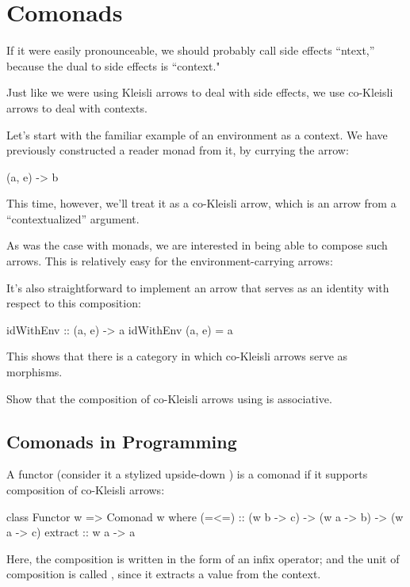 \documentclass[DaoFP]{subfiles}
\begin{document}
\setcounter{chapter}{15}

\chapter{Comonads}

If it were easily pronounceable, we should probably call side effects ``ntext,'' because the dual to side effects is ``context."

Just like we were using Kleisli arrows to deal with side effects, we use co-Kleisli arrows to deal with contexts. 

Let's start with the familiar example of an environment as a context. We have previously constructed a reader monad from it, by currying the arrow:
\begin{haskell}
(a, e) -> b
\end{haskell}
This time, however, we'll treat it as a co-Kleisli arrow, which is an arrow from a ``contextualized'' argument.

As was the case with monads, we are interested in being able to compose such arrows. This is relatively easy for the environment-carrying arrows:

It's also straightforward to implement an arrow that serves as an identity with respect to this composition:

\begin{haskell}
idWithEnv :: (a, e) -> a
idWithEnv (a, e) = a
\end{haskell}

This shows that there is a category in which co-Kleisli arrows serve as morphisms. 

\begin{exercise}
Show that the composition of co-Kleisli arrows using  is associative.
\end{exercise}

\section{Comonads in Programming}

A functor  (consider it a stylized upside-down ) is a comonad if it supports composition of co-Kleisli arrows:

\begin{haskell}
class Functor w => Comonad w where
   (=<=) :: (w b -> c) -> (w a -> b) -> (w a -> c)
   extract :: w a -> a
\end{haskell}
Here, the composition is written in the form of an infix operator; and the unit of composition is called , since it extracts a value from the context. 
\end{document}
